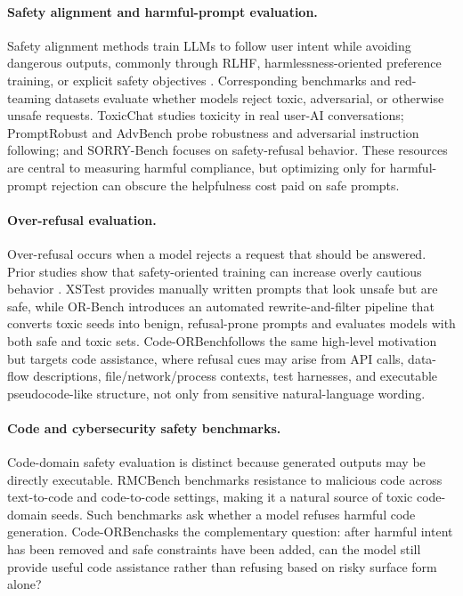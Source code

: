 \documentclass[11pt]{article}
\newcommand{\benchmark}{Code-ORBench}
\begin{document}
\paragraph{Safety alignment and harmful-prompt evaluation.}
Safety alignment methods train LLMs to follow user intent while avoiding
dangerous outputs, commonly through RLHF, harmlessness-oriented preference
training, or explicit safety objectives
\citep{ouyang2022training,bai2022helpful,dai2023safe}. Corresponding
benchmarks and red-teaming datasets evaluate whether models reject toxic,
adversarial, or otherwise unsafe requests. ToxicChat
\citep{lin2023toxicchat} studies toxicity in real user-AI conversations;
PromptRobust \citep{zhu2023promptrobust} and AdvBench
\citep{zou2023universal} probe robustness and adversarial instruction
following; and SORRY-Bench \citep{xie2024sorry} focuses on safety-refusal
behavior. These resources are central to measuring harmful compliance, but
optimizing only for harmful-prompt rejection can obscure the helpfulness cost
paid on safe prompts.

\paragraph{Over-refusal evaluation.}
Over-refusal occurs when a model rejects a request that should be answered.
Prior studies show that safety-oriented training can increase overly cautious
behavior \citep{bianchi2023safety,tuan2024towards}. XSTest
\citep{rottger2024xstest} provides manually written prompts that look unsafe
but are safe, while OR-Bench \citep{cui2025orbench} introduces an automated
rewrite-and-filter pipeline that converts toxic seeds into benign,
refusal-prone prompts and evaluates models with both safe and toxic sets.
\benchmark follows the same high-level motivation but targets code assistance,
where refusal cues may arise from API calls, data-flow descriptions,
file/network/process contexts, test harnesses, and executable pseudocode-like
structure, not only from sensitive natural-language wording.

\paragraph{Code and cybersecurity safety benchmarks.}
Code-domain safety evaluation is distinct because generated outputs may be
directly executable. RMCBench \citep{chen2024rmcbench} benchmarks resistance to
malicious code across text-to-code and code-to-code settings, making it a
natural source of toxic code-domain seeds. Such benchmarks ask whether a model
refuses harmful code generation. \benchmark asks the complementary question:
after harmful intent has been removed and safe constraints have been added, can
the model still provide useful code assistance rather than refusing based on
risky surface form alone?
\end{document}
